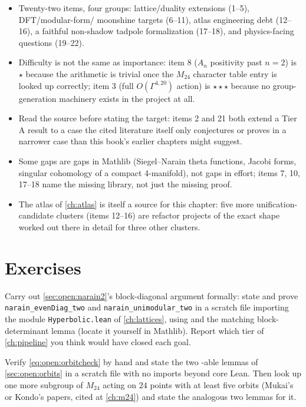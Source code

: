 \begin{summarybox}
\begin{itemize}[leftmargin=*,itemsep=1pt]
\item Twenty-two items, four groups: lattice/duality extensions (1--5), DFT/modular-form/
  moonshine targets (6--11), atlas engineering debt (12--16), a faithful non-shadow
  tadpole formalization (17--18), and physics-facing questions (19--22).
\item Difficulty is not the same as importance: item 8 ($A_n$ positivity past $n=2$) is
  $\star$ because the arithmetic is trivial once the $M_{24}$ character table entry is
  looked up correctly; item 3 (full $O(\Gamma^{4,20})$ action) is $\star\star\star$ because
  no group-generation machinery exists in the project at all.
\item Read the source before stating the target: items 2 and 21 both extend a Tier A
  result to a case the cited literature itself only conjectures or proves in a narrower
  case than this book's earlier chapters might suggest.
\item Some gaps are gaps in Mathlib (Siegel--Narain theta functions, Jacobi forms,
  singular cohomology of a compact 4-manifold), not gaps in effort; items 7, 10, 17--18
  name the missing library, not just the missing proof.
\item The atlas of \cref{ch:atlas} is itself a source for this chapter: five more
  unification-candidate clusters (items 12--16) are refactor projects of the exact shape
  worked out there in detail for three other clusters.
\end{itemize}
\end{summarybox}

\section*{Exercises}

\begin{exercise}[$\star$]
Carry out \cref{sec:open:narain2}'s block-diagonal argument formally: state and prove
\texttt{narain\_evenDiag\_two} and \texttt{narain\_unimodular\_two} in a scratch file
importing the module \texttt{Hyperbolic.lean} of \cref{ch:lattices}, using
 and the matching block-determinant lemma (locate it yourself in
Mathlib). Report which tier of \cref{ch:pipeline} you think would have closed each goal.
\end{exercise}

\begin{exercise}[$\star$]
Verify \cref{eq:open:orbitcheck} by hand and state the two -able lemmas of
\cref{sec:open:orbits} in a scratch file with no imports beyond core Lean. Then look up
one more subgroup of $M_{24}$ acting on $24$ points with at least five orbits (Mukai's or
Kondo's papers, cited at \cref{ch:m24}) and state the analogous two lemmas for it.
\end{exercise}

